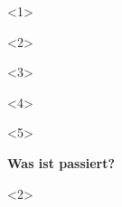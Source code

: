 \begin{frame}[c, fragile]
\begin{center}
        \begin{onlyenv}<1>
        \end{onlyenv}
        \begin{onlyenv}<2>
        \end{onlyenv}
        \begin{onlyenv}<3>
        \end{onlyenv}
        \begin{onlyenv}<4>
        \end{onlyenv}
        \begin{onlyenv}<5>
        \end{onlyenv}
        \vspace{-1em}
    \end{center}
\end{frame}

\begin{frame}[c]
    \slidehead
    \centering
    \large
    \textbf{Was ist passiert?}
    \small
    \begin{onlyenv}<2>
    \end{onlyenv}
\end{frame}

